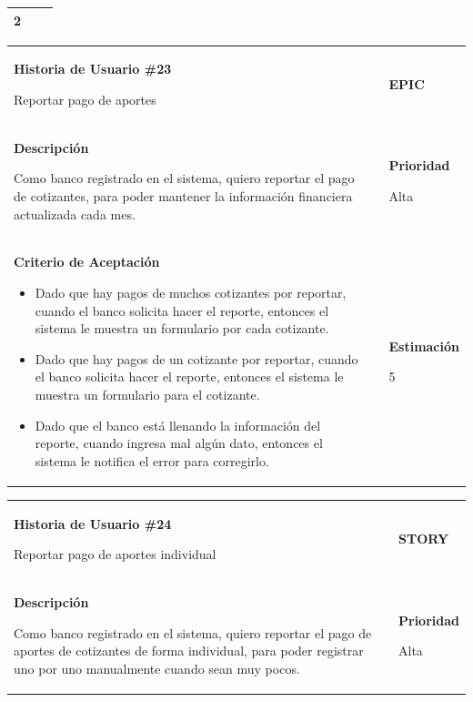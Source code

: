 \documentclass[12pt,a4paper]{article}
\begin{document}
\begin{center}
\begin{tabular}{| p{10cm} c p{2.5cm}|}
2 \\ 
\hline 
\end{tabular}
\vspace{5mm}

\begin{tabular}{|>{\columncolor[RGB]{215, 215, 215}} p{10cm} >{\columncolor[RGB]{215, 215, 215}} c >{\columncolor[RGB]{215, 215, 215}} p{2.5cm}|}
\hline 
\textbf{Historia de Usuario \#23}

Reportar pago de aportes & & \textbf{{\Large EPIC}} \\ 
\textbf{Descripción}

Como banco registrado en el sistema, quiero reportar el pago de
cotizantes, para poder mantener la información financiera actualizada
cada mes. &  & \textbf{Prioridad}

Alta\\

\textbf{Criterio de Aceptación}

\begin{itemize}
\item Dado que hay pagos de muchos cotizantes por reportar, cuando
el banco solicita hacer el reporte, entonces el sistema le muestra
un formulario por cada cotizante.
\item Dado que hay pagos de un cotizante por reportar, cuando el
banco solicita hacer el reporte, entonces el sistema le muestra un
formulario para el cotizante.
\item Dado que el banco está llenando la información del reporte,
cuando ingresa mal algún dato, entonces el sistema le notifica el
error para corregirlo.
\end{itemize} & & \textbf{Estimación}

5 \\ 
\hline 
\end{tabular}
\vspace{5mm}

\begin{tabular}{| p{10cm} c p{2.5cm}|}
\hline 
\textbf{Historia de Usuario \#24}

Reportar pago de aportes individual & & \textbf{{\Large STORY}} \\ 
\textbf{Descripción}

Como banco registrado en el sistema, quiero reportar el pago de aportes
de cotizantes de forma individual, para poder registrar uno por uno
manualmente cuando sean muy pocos. &  & \textbf{Prioridad}

Alta\\


\end{tabular}
\end{center}
\end{document}
